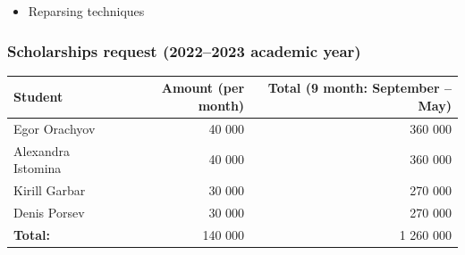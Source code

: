 \documentclass[xcolor=table,aspectratio=169]{beamer}
\begin{document}
\begin{frame}[fragile]
\begin{minipage}[t]{0.48\textwidth}
\begin{itemize}
      \item Reparsing techniques
    \end{itemize}
  \end{minipage}
\end{frame}

\begin{frame}[fragile]
  \frametitle{Scholarships request (2022--2023 academic year)}
    \begin{center}
      \begin{tabular} {l  r  r} 
        Student & Amount (per month) & Total (9 month: September -- May)\\
        \hline
        Egor Orachyov & 40 000      & 360 000 \\
        Alexandra Istomina & 40 000      & 360 000 \\
        Kirill Garbar & 30 000      & 270 000 \\
        Denis Porsev & 30 000      & 270 000 \\
        \hline 
        \textbf{Total:} & 140 000 & 1 260 000 
      \end{tabular}
    \end{center}
\end{frame}
\end{document}
